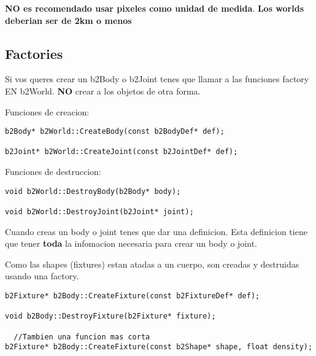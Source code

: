 \documentclass[11pt]{article}
\begin{document}
\textbf{NO es recomendado usar pixeles como unidad de medida}.
\textbf{Los worlds deberian ser de 2km o menos}

\subsection{Factories}
\label{sec:orge792f8f}
Si vos queres crear un b2Body o b2Joint tenes que llamar a las funciones factory EN b2World.
\textbf{NO} crear a los objetos de otra forma.

Funciones de creacion:
\begin{verbatim}
b2Body* b2World::CreateBody(const b2BodyDef* def);

b2Joint* b2World::CreateJoint(const b2JointDef* def);
\end{verbatim}

Funciones de destruccion:
\begin{verbatim}
void b2World::DestroyBody(b2Body* body);

void b2World::DestroyJoint(b2Joint* joint);

\end{verbatim}


Cuando creas un body o joint tenes que dar una definicion. Esta definicion tiene que tener \textbf{toda} la infomacion necesaria  para crear un body o joint.

Como las shapes (fixtures) estan atadas a un cuerpo, son creadas y destruidas usando una factory.
\begin{verbatim}
b2Fixture* b2Body::CreateFixture(const b2FixtureDef* def);

void b2Body::DestroyFixture(b2Fixture* fixture);

  //Tambien una funcion mas corta
b2Fixture* b2Body::CreateFixture(const b2Shape* shape, float density);



\end{verbatim}
\end{document}
